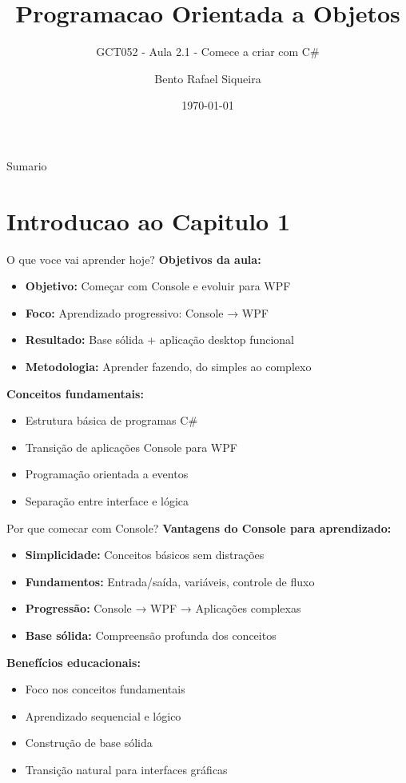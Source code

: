 \documentclass[aspectratio=169]{beamer}
\title{Programacao Orientada a Objetos}
\subtitle{GCT052 - Aula 2.1 - Comece a criar com C\#}
\author{Bento Rafael Siqueira}
\institute{Universidade Federal de Lavras (UFLA)}
\date{\today}
\begin{document}
\begin{frame}
\titlepage
\end{frame}

\begin{frame}{Sumario}
\tableofcontents
\end{frame}

\section{Introducao ao Capitulo 1}

\begin{frame}{O que voce vai aprender hoje?}
\textbf{Objetivos da aula:}
\begin{itemize}
    \item \textbf{Objetivo:} Começar com Console e evoluir para WPF
    \item \textbf{Foco:} Aprendizado progressivo: Console → WPF
    \item \textbf{Resultado:} Base sólida + aplicação desktop funcional
    \item \textbf{Metodologia:} Aprender fazendo, do simples ao complexo
\end{itemize}

\textbf{Conceitos fundamentais:}
\begin{itemize}
    \item Estrutura básica de programas C\#
    \item Transição de aplicações Console para WPF
    \item Programação orientada a eventos
    \item Separação entre interface e lógica
\end{itemize}
\end{frame}

\begin{frame}{Por que comecar com Console?}
\textbf{Vantagens do Console para aprendizado:}
\begin{itemize}
    \item \textbf{Simplicidade:} Conceitos básicos sem distrações
    \item \textbf{Fundamentos:} Entrada/saída, variáveis, controle de fluxo
    \item \textbf{Progressão:} Console → WPF → Aplicações complexas
    \item \textbf{Base sólida:} Compreensão profunda dos conceitos
\end{itemize}

\textbf{Benefícios educacionais:}
\begin{itemize}
    \item Foco nos conceitos fundamentais
    \item Aprendizado sequencial e lógico
    \item Construção de base sólida
    \item Transição natural para interfaces gráficas
\end{itemize}
\end{frame}
\end{document}
